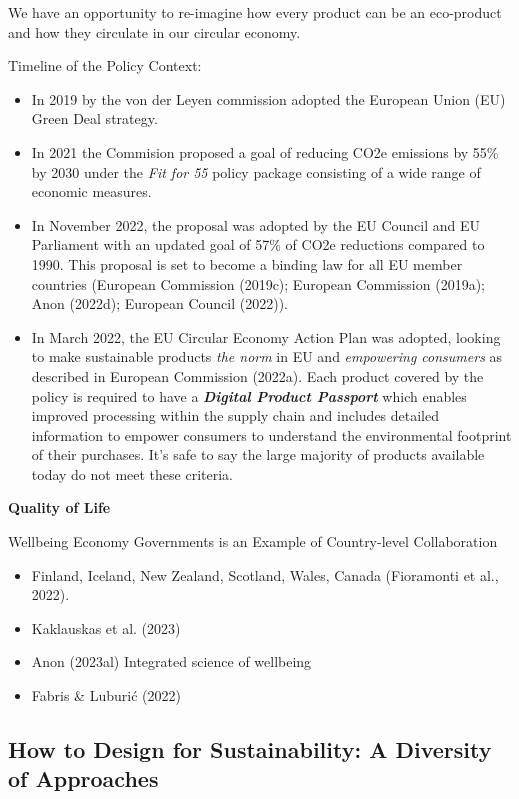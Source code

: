 \documentclass[
  letterpaper,
  DIV=11,
  numbers=noendperiod]{scrartcl}
\providecommand{\tightlist}{%
  \setlength{\itemsep}{0pt}\setlength{\parskip}{0pt}}\usepackage{longtable,booktabs,array}
\begin{document}
We have an opportunity to re-imagine how every product can be an
eco-product and how they circulate in our circular economy.

Timeline of the Policy Context:

\begin{itemize}
\item
  In 2019 by the von der Leyen commission adopted the European Union
  (EU) Green Deal strategy.
\item
  In 2021 the Commision proposed a goal of reducing CO2e emissions by
  55\% by 2030 under the \emph{Fit for 55} policy package consisting of
  a wide range of economic measures.
\item
  In November 2022, the proposal was adopted by the EU Council and EU
  Parliament with an updated goal of 57\% of CO2e reductions compared to
  1990. This proposal is set to become a binding law for all EU member
  countries (European Commission (2019c); European Commission (2019a);
  Anon (2022d); European Council (2022)).
\item
  In March 2022, the EU Circular Economy Action Plan was adopted,
  looking to make sustainable products \emph{the norm} in EU and
  \emph{empowering consumers} as described in European Commission
  (2022a). Each product covered by the policy is required to have a
  \textbf{\emph{Digital Product Passport}} which enables improved
  processing within the supply chain and includes detailed information
  to empower consumers to understand the environmental footprint of
  their purchases. It's safe to say the large majority of products
  available today do not meet these criteria.
\end{itemize}

\textbf{Quality of Life}

Wellbeing Economy Governments is an Example of Country-level
Collaboration

\begin{itemize}
\tightlist
\item
  Finland, Iceland, New Zealand, Scotland, Wales, Canada (Fioramonti et
  al., 2022).
\item
  Kaklauskas et al. (2023)
\item
  Anon (2023al) Integrated science of wellbeing
\item
  Fabris \& Luburić (2022)
\end{itemize}

\subsection{How to Design for Sustainability: A Diversity of
Approaches}\label{how-to-design-for-sustainability-a-diversity-of-approaches}
\end{document}
